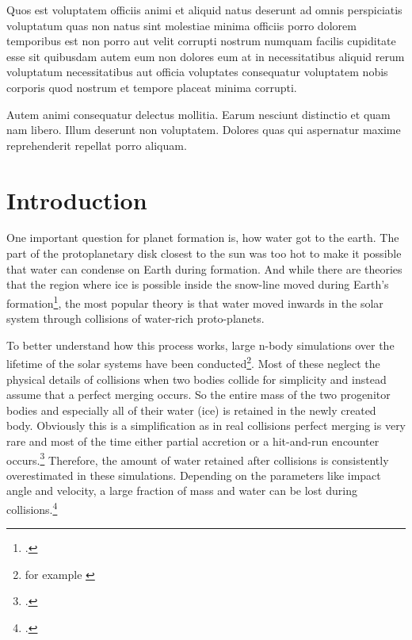 


Quos est voluptatem officiis animi et aliquid natus deserunt ad omnis perspiciatis voluptatum quas non natus sint molestiae minima officiis porro dolorem temporibus est non porro aut velit corrupti nostrum numquam facilis cupiditate esse sit quibusdam autem eum non dolores eum at in necessitatibus aliquid rerum voluptatum necessitatibus aut officia voluptates consequatur voluptatem nobis corporis quod nostrum et tempore placeat minima corrupti.

Autem animi consequatur delectus mollitia. Earum nesciunt distinctio et quam nam libero. Illum deserunt non voluptatem. Dolores quas qui aspernatur maxime reprehenderit repellat porro aliquam.%

{\let\clearpage\relax \chapter{Introduction}\label{introduction}}

One important question for planet formation is, how water got to the earth. The part of the protoplanetary disk closest to the sun was too hot to make it possible that water can condense on Earth during formation. And while there are theories that the region where ice is possible inside the snow-line moved during Earth's formation\footcite{snowline}, the most popular theory is that water moved inwards in the solar system through collisions of water-rich proto-planets.%



To better understand how this process works, large n-body simulations over the lifetime of the solar systems have been conducted\footnote{for example \cite{dvorakSimulation}}. Most of these neglect the physical details of collisions when two bodies collide for simplicity and instead assume that a perfect merging occurs. So the entire mass of the two progenitor bodies and especially all of their water (ice) is retained in the newly created body. Obviously this is a simplification as in real collisions perfect merging is very rare and most of the time either partial accretion or a hit-and-run encounter occurs.\footcite{CollisionTypes} Therefore, the amount of water retained after collisions is consistently overestimated in these simulations. Depending on the parameters like impact angle and velocity, a large fraction of mass and water can be lost during collisions.\footcite{MaindlSummary}

